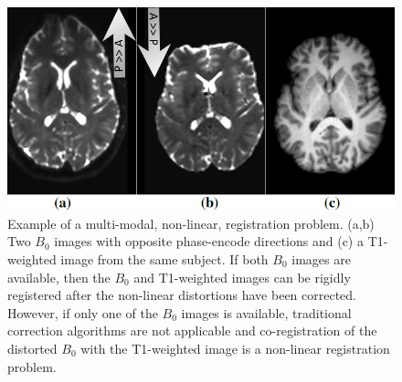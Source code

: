 \begin{figure}[t!]
\centering
    \includegraphics[width=1\linewidth]{./images/T1B0Result/figure1.png}
    \closer
    \caption{{\small Example of a multi-modal, non-linear, registration problem. (a,b) Two $B_{0}$ images with opposite phase-encode directions and (c) a T1-weighted image from the same subject. If both $B_{0}$ images are available, then the $B_{0}$ and T1-weighted images can be rigidly registered after the non-linear distortions have been corrected. However, if only one of the $B_{0}$ images is available, traditional correction algorithms are not applicable and co-registration of the distorted $B_{0}$ with the T1-weighted image is a non-linear registration problem.}}
\label{fig:example_t1b0_problem}\figcloser
\end{figure}
\vspace{-0.4cm}
